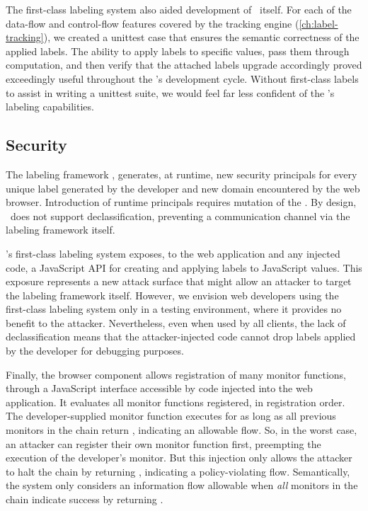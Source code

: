 The first-class labeling system also aided development of \JitFlow\ itself.
For each of the data-flow and control-flow features covered by the tracking engine (\autoref{ch:label-tracking}), we created a unittest case that ensures the semantic correctness of the applied labels.
The ability to apply labels to specific values, pass them through computation, and then verify that the attached labels upgrade accordingly proved exceedingly useful throughout the \JitFlow's development cycle.
Without first-class labels to assist in writing a unittest suite, we would feel far less confident of the \JitFlow's labeling capabilities.

\subsection{Security}

The labeling framework \JitFlow, generates, at runtime, new security principals for every unique label generated by the developer and new domain encountered by the web browser.
Introduction of runtime principals requires mutation of the \FlowLabelRegistry.
By design, \JitFlow\ does not support declassification, preventing a communication channel via the labeling framework itself.

\JitFlow's first-class labeling system exposes, to the web application and any injected code, a JavaScript API for creating and applying labels to JavaScript values.
This exposure represents a new attack surface that might allow an attacker to target the labeling framework itself.
However, we envision web developers using the first-class labeling system only in a testing environment, where it provides no benefit to the attacker.
Nevertheless, even when used by all clients, the lack of declassification means that the attacker-injected code cannot drop labels applied by the developer for debugging purposes.

Finally, the browser component allows registration of many monitor functions, through a JavaScript interface accessible by code injected into the web application.
It evaluates all monitor functions registered, in registration order.
The developer-supplied monitor function executes for as long as all previous monitors in the chain return , indicating an allowable flow.
So, in the worst case, an attacker can register their own monitor function first, preempting the execution of the developer's monitor.
But this injection only allows the attacker to halt the chain by returning , indicating a policy-violating flow.
Semantically, the system only considers an information flow allowable when \emph{all} monitors in the chain indicate success by returning .

